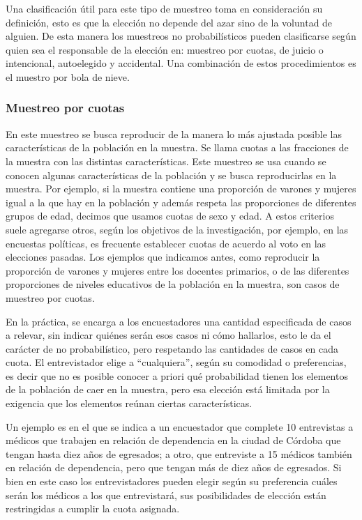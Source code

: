 \documentclass[]{article}
\begin{document}
Una clasificación útil para este tipo de muestreo toma en consideración
su definición, esto es que la elección no depende del azar sino de la
voluntad de alguien. De esta manera los muestreos no probabilísticos
pueden clasificarse según quien sea el responsable de la elección en:
muestreo por cuotas, de juicio o intencional, autoelegido y accidental.
Una combinación de estos procedimientos es el muestro por bola de nieve.

\hypertarget{muestreo-por-cuotas}{%
\subsubsection{Muestreo por cuotas}\label{muestreo-por-cuotas}}

En este muestreo se busca reproducir de la manera lo más ajustada
posible las características de la población en la muestra. Se llama
cuotas a las fracciones de la muestra con las distintas características.
Este muestreo se usa cuando se conocen algunas características de la
población y se busca reproducirlas en la muestra. Por ejemplo, si la
muestra contiene una proporción de varones y mujeres igual a la que hay
en la población y además respeta las proporciones de diferentes grupos
de edad, decimos que usamos cuotas de sexo y edad. A estos criterios
suele agregarse otros, según los objetivos de la investigación, por
ejemplo, en las encuestas políticas, es frecuente establecer cuotas de
acuerdo al voto en las elecciones pasadas. Los ejemplos que indicamos
antes, como reproducir la proporción de varones y mujeres entre los
docentes primarios, o de las diferentes proporciones de niveles
educativos de la población en la muestra, son casos de muestreo por
cuotas.

En la práctica, se encarga a los encuestadores una cantidad especificada
de casos a relevar, sin indicar quiénes serán esos casos ni cómo
hallarlos, esto le da el carácter de no probabilístico, pero respetando
las cantidades de casos en cada cuota. El entrevistador elige a
``cualquiera'', según su comodidad o preferencias, es decir que no es
posible conocer a priori qué probabilidad tienen los elementos de la
población de caer en la muestra, pero esa elección está limitada por la
exigencia que los elementos reúnan ciertas características.

Un ejemplo es en el que se indica a un encuestador que complete 10
entrevistas a médicos que trabajen en relación de dependencia en la
ciudad de Córdoba que tengan hasta diez años de egresados; a otro, que
entreviste a 15 médicos también en relación de dependencia, pero que
tengan más de diez años de egresados. Si bien en este caso los
entrevistadores pueden elegir según su preferencia cuáles serán los
médicos a los que entrevistará, sus posibilidades de elección están
restringidas a cumplir la cuota asignada.
\end{document}
